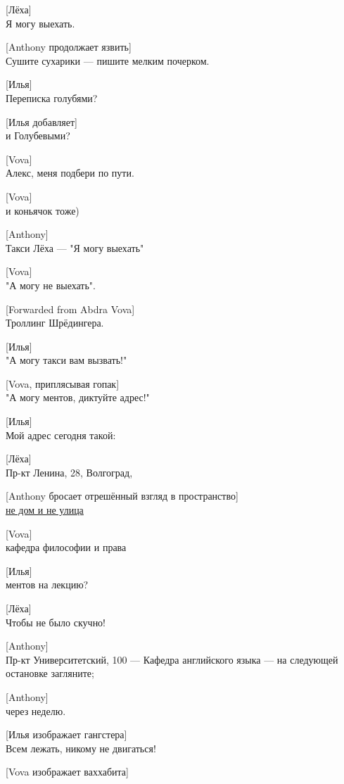 [Лёха]\\
Я могу выехать.


[Anthony продолжает язвить]\\
Сушите сухарики --- пишите мелким почерком.


[Илья]\\
Переписка голубями?


[Илья добавляет]\\
и Голубевыми?


[Vova]\\
Алекс, меня подбери по пути.


[Vova]\\
и коньячок тоже)


[Anthony]\\
Такси Лёха --- "Я могу выехать"


[Vova]\\
"А могу не выехать".


[Forwarded from Abdra Vova]\\
Троллинг Шрёдингера.


[Илья]\\
"А могу такси вам вызвать!"


[Vova, приплясывая гопак]\\
"А могу ментов, диктуйте адрес!"


[Илья]\\
Мой адрес сегодня такой:


[Лёха]\\
Пр-кт Ленина, 28, Волгоград,


[Anthony бросает отрешённый взгляд в пространство]\\
\href{http://pine-forum.herokuapp.com/}{не дом и не улица}


[Vova]\\
кафедра философии и права


[Илья]\\ 
ментов на лекцию?


[Лёха]\\
Чтобы не было скучно!


[Anthony]\\
Пр-кт Университетский, 100 --- Кафедра английского языка --- на следующей остановке загляните;


[Anthony]\\
через неделю.


[Илья изображает гангстера]\\
Всем лежать, никому не двигаться!


[Vova изображает ваххабита]


